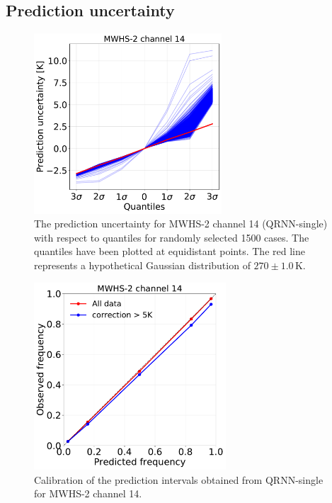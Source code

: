 \documentclass[amt, manuscript]{copernicus}
\begin{document}
\subsection{Prediction uncertainty}

\begin{figure}[t]
	\includegraphics[width = 70mm]{Figures/prediction_uncertainty_MWHS_14.pdf}	
	\caption{The prediction uncertainty for MWHS-2 channel 14 (QRNN-single) with respect to quantiles for randomly selected 1500 cases. The quantiles have been plotted at equidistant points. The red line represents a hypothetical Gaussian distribution of $270\pm1.0$\,K.}
	\label{fig:prediction_uncertainty_mwhs}	
\end{figure}
\begin{figure}[t]
	\includegraphics[height = 70mm]{Figures/calibration_QRNN_MWHS_14.pdf}	
	\caption{Calibration of the prediction intervals obtained from QRNN-single for MWHS-2 channel 14. }
	\label{fig:calibration_mwhs}	
\end{figure}
\end{document}
